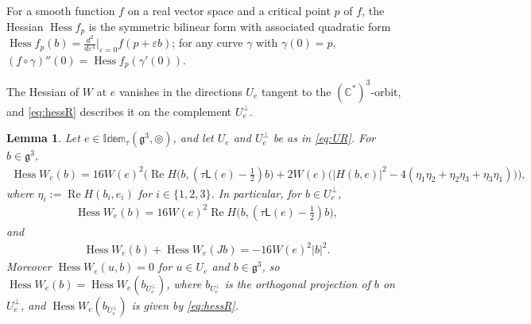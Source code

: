 \documentclass[leqno,10pt]{amsart}
\newtheorem{lemma}[theorem]{Lemma}%
\theoremstyle{definition}
\numberwithin{equation}{section}
\newcommand{\idem}{\mathbb{Idem}}
\newcommand{\tmlt}{\circledcirc}
\newcommand{\hess}{\operatorname{Hess}}
\newcommand{\lin}{\mathsf{L}}
\newcommand{\re}{\operatorname{Re}}
\newcommand{\g}{\mathfrak{g}}
\newcommand{\com}{\mathbb C}
\newcommand{\nnorm}[1]{\lvert #1\rvert}%
\newcommand{\Usp}{U}
\newcommand{\Uperp}{\Usp^{\perp}}
\begin{document}
For a smooth function $f$ on a real vector space and a critical point $p$ of $f$, the Hessian $\hess f_{p}$ is the symmetric bilinear form with associated quadratic form $\hess f_{p}(b) = \tfrac{d^{2}}{d\varepsilon^{2}}\big|_{\varepsilon = 0}f(p + \varepsilon b)$; for any curve $\gamma$ with $\gamma(0) = p$, $(f \circ \gamma)''(0) = \hess f_{p}(\gamma'(0))$.

The Hessian of $W$ at $e$ vanishes in the directions $\Usp_{e}$ tangent to the $(\com^{\ast})^{3}$-orbit, and \eqref{eq:hessR} describes it on the complement $\Uperp_{e}$.
\begin{lemma}\label{thm:hessW}
Let $e \in \idem_{\tau}(\g^{3}, \tmlt)$, and let $\Usp_{e}$ and $\Uperp_{e}$ be as in \eqref{eq:UR}. 
For $b \in \g^{3}$, 
\begin{align}\label{eq:hessW}
\hess W_{e}(b) = 16W(e)^{2}\Big(\re H\big(b, (\tau\lin(e) - \tfrac{1}{2})b\big) + 2W(e)\big(|H(b, e)|^{2} - 4(\eta_{1}\eta_{2} + \eta_{2}\eta_{3} + \eta_{3}\eta_{1})\big)\Big),
\end{align}
where $\eta_{i} := \re H(b_{i}, e_{i})$ for $i \in \{1, 2, 3\}$.
In particular, for $b \in \Uperp_{e}$,
\begin{align}\label{eq:hessR}
\hess W_{e}(b) = 16W(e)^{2}\re H\big(b, (\tau\lin(e) - \tfrac{1}{2})b\big),
\end{align}
and
\begin{align}\label{eq:hessJ}
\hess W_{e}(b) + \hess W_{e}(Jb) = -16W(e)^{2}\nnorm{b}^{2}.
\end{align}
Moreover $\hess W_{e}(u, b) = 0$ for $u \in \Usp_{e}$ and $b \in \g^{3}$, so $\hess W_{e}(b) = \hess W_{e}(b_{\Uperp_{e}})$, where $b_{\Uperp_{e}}$ is the orthogonal projection of $b$ on $\Uperp_{e}$, and $\hess W_{e}(b_{\Uperp_{e}})$ is given by \eqref{eq:hessR}.
\end{lemma}
\end{document}
